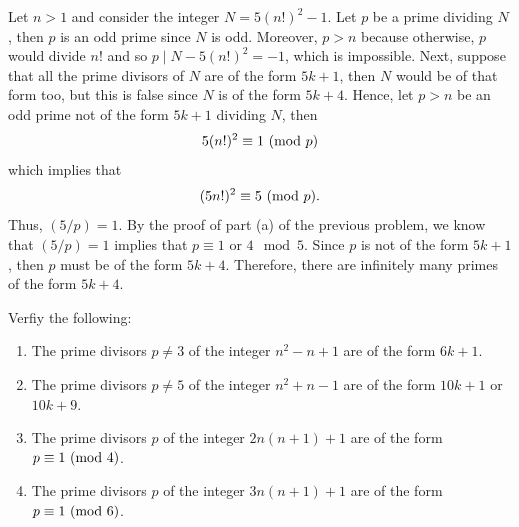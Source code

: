 \begin{solution}
    Let $n > 1$ and consider the integer $N = 5(n!)^2 - 1$. Let $p$ be a prime dividing $N$, then $p$ is an odd prime since $N$ is odd. Moreover, $p > n$ because otherwise, $p$ would divide $n!$ and so $p \mid N - 5(n!)^2 = -1$, which is impossible. Next, suppose that all the prime divisors of $N$ are of the form $5k+1$, then $N$ would be of that form too, but this is false since $N$ is of the form $5k + 4$. Hence, let $p>n$ be an odd prime not of the form $5k+1$ dividing $N$, then 
    $$5(n!)^2 \equiv 1 \ (\mathrm{mod}\ p)$$
    which implies that
    $$(5n!)^2 \equiv 5 \ (\mathrm{mod}\ p).$$
    Thus, $(5/p) = 1$. By the proof of part (a) of the previous problem, we know that $(5/p) = 1$ implies that $p \equiv 1 \text{ or } 4 \mod 5$. Since $p$ is not of the form $5k+1$, then $p$ must be of the form $5k+4$. Therefore, there are infinitely many primes of the form $5k+4$. \\
\end{solution}

\begin{exercise}
    Verfiy the following:
    \begin{enumerate}
        \item The prime divisors $p \neq 3$ of the integer $n^2 - n + 1$ are of the form $6k+1$. 
        \item The prime divisors $p \neq 5$ of the integer $n^2 + n - 1$ are of the form $10k + 1$ or $10k + 9$.
        \item The prime divisors $p$ of the integer $2n(n+1) + 1$ are of the form $p \equiv 1 \ (\mathrm{mod}\ 4)$. 
        \item The prime divisors $p$ of the integer $3n(n+1) + 1$ are of the form $p \equiv 1 \ (\mathrm{mod}\ 6)$. \\
    \end{enumerate}
\end{exercise}

